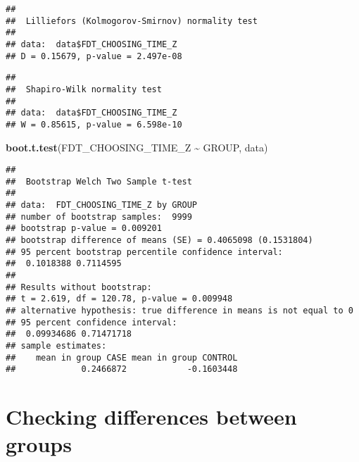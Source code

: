 \documentclass[
]{article}
\newenvironment{Shaded}{\begin{snugshade}}{\end{snugshade}}
\newcommand{\FunctionTok}[1]{\textcolor[rgb]{0.13,0.29,0.53}{\textbf{#1}}}
\newcommand{\NormalTok}[1]{#1}
\newcommand{\SpecialCharTok}[1]{\textcolor[rgb]{0.81,0.36,0.00}{\textbf{#1}}}
\begin{document}
\begin{Shaded}
\end{Shaded}

\begin{verbatim}
## 
##  Lilliefors (Kolmogorov-Smirnov) normality test
## 
## data:  data$FDT_CHOOSING_TIME_Z
## D = 0.15679, p-value = 2.497e-08
\end{verbatim}

\begin{Shaded}
\end{Shaded}

\begin{verbatim}
## 
##  Shapiro-Wilk normality test
## 
## data:  data$FDT_CHOOSING_TIME_Z
## W = 0.85615, p-value = 6.598e-10
\end{verbatim}

\begin{Shaded}
\begin{Highlighting}[]
\FunctionTok{boot.t.test}\NormalTok{(FDT\_CHOOSING\_TIME\_Z }\SpecialCharTok{\textasciitilde{}}\NormalTok{ GROUP, data)}
\end{Highlighting}
\end{Shaded}

\begin{verbatim}
## 
##  Bootstrap Welch Two Sample t-test
## 
## data:  FDT_CHOOSING_TIME_Z by GROUP
## number of bootstrap samples:  9999
## bootstrap p-value = 0.009201 
## bootstrap difference of means (SE) = 0.4065098 (0.1531804) 
## 95 percent bootstrap percentile confidence interval:
##  0.1018388 0.7114595
## 
## Results without bootstrap:
## t = 2.619, df = 120.78, p-value = 0.009948
## alternative hypothesis: true difference in means is not equal to 0
## 95 percent confidence interval:
##  0.09934686 0.71471718
## sample estimates:
##    mean in group CASE mean in group CONTROL 
##             0.2466872            -0.1603448
\end{verbatim}

\section{\texorpdfstring{\textbf{Checking differences between
groups}}{Checking differences between groups}}\label{checking-differences-between-groups-7}
\end{document}
